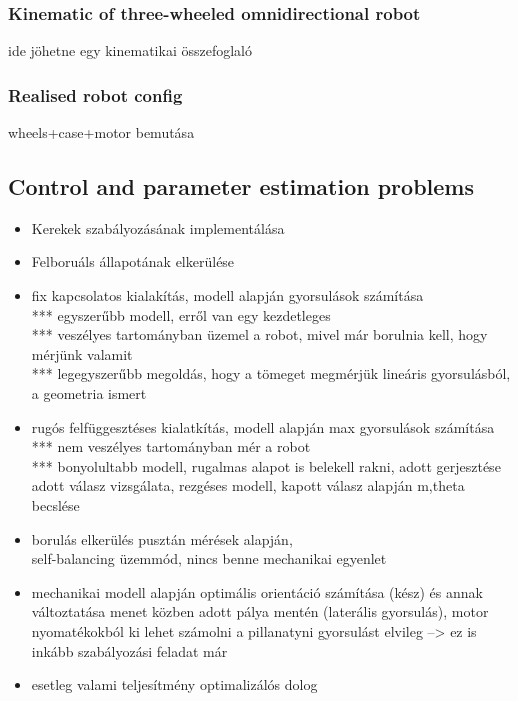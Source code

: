 \documentclass[12pt,english]{article}
\begin{document}
\subsubsection{Kinematic of three-wheeled omnidirectional robot}
ide jöhetne egy kinematikai összefoglaló
\subsubsection{Realised robot config}
wheels+case+motor bemutása
\subsection{Control and parameter estimation problems}
\begin{itemize}
	\item Kerekek szabályozásának implementálása
	\item Felboruáls állapotának elkerülése
	\item fix kapcsolatos kialakítás, modell alapján gyorsulások számítása \\
			*** egyszerűbb modell, erről van egy kezdetleges \\
			*** veszélyes tartományban üzemel a robot, mivel már borulnia kell, hogy mérjünk valamit \\
			*** legegyszerűbb megoldás, hogy a tömeget megmérjük lineáris gyorsulásból, a geometria ismert \\
	\item rugós felfüggesztéses kialatkítás, modell alapján max gyorsulások számítása\\
			*** nem veszélyes tartományban mér a  robot \\
			*** bonyolultabb modell, rugalmas alapot is belekell rakni, adott gerjesztése adott válasz vizsgálata, rezgéses modell, kapott válasz alapján m,theta becslése \\
	\item borulás elkerülés pusztán mérések alapján,\\ self-balancing üzemmód, nincs benne mechanikai egyenlet
	\item mechanikai modell alapján optimális orientáció számítása (kész) és annak változtatása menet közben adott pálya mentén (laterális gyorsulás), motor nyomatékokból ki lehet számolni a pillanatyni gyorsulást elvileg --> ez is inkább szabályozási feladat már \\
	\item esetleg valami teljesítmény optimalizálós dolog
	
	
		
		
			
\end{itemize}
\end{document}
